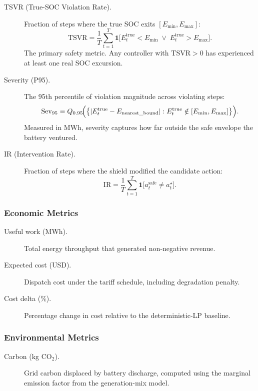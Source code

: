 \begin{description}
  \item[TSVR (True-SOC Violation Rate).]
    Fraction of steps where the true SOC exits $[E_{\min}, E_{\max}]$:
    \[
      \mathrm{TSVR} = \frac{1}{T}\sum_{t=1}^{T}
        \mathbf{1}\!\bigl[E_t^{\mathrm{true}} < E_{\min}
          \;\lor\; E_t^{\mathrm{true}} > E_{\max}\bigr].
    \]
    The primary safety metric.  Any controller with $\mathrm{TSVR} > 0$
    has experienced at least one real SOC excursion.

  \item[Severity (P95).]
    The 95th percentile of violation magnitude across violating steps:
    \[
      \mathrm{Sev}_{95} = Q_{0.95}\!\Bigl(\bigl\{
        |E_t^{\mathrm{true}} - E_{\mathrm{nearest\_bound}}|
        : E_t^{\mathrm{true}} \notin [E_{\min}, E_{\max}]\bigr\}\Bigr).
    \]
    Measured in MWh, severity captures how far outside the safe envelope
    the battery ventured.

  \item[IR (Intervention Rate).]
    Fraction of steps where the shield modified the candidate action:
    \[
      \mathrm{IR} = \frac{1}{T}\sum_{t=1}^{T}
        \mathbf{1}\!\bigl[a_t^{\mathrm{safe}} \neq a_t^\star\bigr].
    \]
\end{description}

\subsubsection{Economic Metrics}

\begin{description}
  \item[Useful work (MWh).]
    Total energy throughput that generated non-negative revenue.
  \item[Expected cost (USD).]
    Dispatch cost under the tariff schedule, including degradation penalty.
  \item[Cost delta (\%).]
    Percentage change in cost relative to the deterministic-LP baseline.
\end{description}

\subsubsection{Environmental Metrics}

\begin{description}
  \item[Carbon (kg CO$_2$).]
    Grid carbon displaced by battery discharge, computed using the
    marginal emission factor from the generation-mix model.
\end{description}

